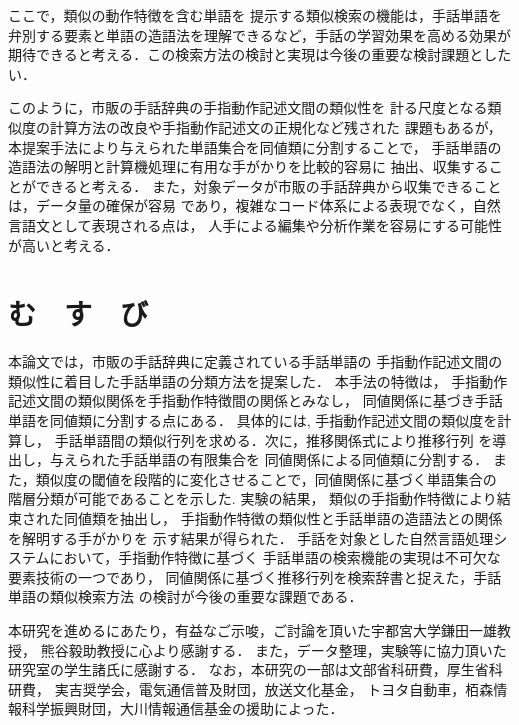 ここで，類似の動作特徴を含む単語を
提示する類似検索の機能は，手話単語を弁別する要素と単語の造語法を理解できるなど，手話の学習効果を高める効果が期待できると考える．この検索方法の検討と実現は今後の重要な検討課題としたい．

このように，市販の手話辞典の手指動作記述文間の類似性を
計る尺度となる類似度の計算方法の改良や手指動作記述文の正規化など残された
課題もあるが，本提案手法により与えられた単語集合を同値類に分割することで，
手話単語の造語法の解明と計算機処理に有用な手がかりを比較的容易に
抽出、収集することができると考える．
また，対象データが市販の手話辞典から収集できることは，データ量の確保が容易
であり，複雑なコード体系による表現でなく，自然言語文として表現される点は，
人手による編集や分析作業を容易にする可能性が高いと考える．

\section {む　す　び}

本論文では，市販の手話辞典に定義されている手話単語の
手指動作記述文間の類似性に着目した手話単語の分類方法を提案した．
本手法の特徴は，
手指動作記述文間の類似関係を手指動作特徴間の関係とみなし，
同値関係に基づき手話単語を同値類に分割する点にある．
具体的には,
手指動作記述文間の類似度を計算し，
手話単語間の類似行列を求める．次に，推移関係式により推移行列
を導出し，与えられた手話単語の有限集合を
同値関係による同値類に分割する．
また，類似度の閾値を段階的に変化させることで，同値関係に基づく単語集合の
階層分類が可能であることを示した.
実験の結果，
類似の手指動作特徴により結束された同値類を抽出し，
手指動作特徴の類似性と手話単語の造語法との関係を解明する手がかりを
示す結果が得られた．
手話を対象とした自然言語処理システムにおいて，手指動作特徴に基づく
手話単語の検索機能の実現は不可欠な要素技術の一つであり，
同値関係に基づく推移行列を検索辞書と捉えた，手話単語の類似検索方法
の検討が今後の重要な課題である．

\acknowledgment

本研究を進めるにあたり，有益なご示唆，ご討論を頂いた宇都宮大学鎌田一雄教授，
熊谷毅助教授に心より感謝する．
また，データ整理，実験等に協力頂いた研究室の学生諸氏に感謝する．
なお，本研究の一部は文部省科研費，厚生省科研費，
実吉奨学会，電気通信普及財団，放送文化基金，
トヨタ自動車，栢森情報科学振興財団，大川情報通信基金の援助によった．






\begin{biography}


\end{biography}



